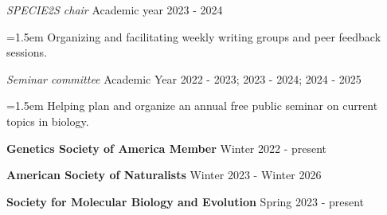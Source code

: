 \documentclass[11pt]{extarticle}
\begin{document}
\vspace{1mm}
\textit{SPECIE2S chair} \hfill Academic year 2023 - 2024 \par
{\narrower \hangindent=1.5em {Organizing and facilitating weekly writing groups and peer feedback sessions.} \normalsize \par }
\vspace{2.5mm}
\vspace{1mm}
\textit{Seminar committee} \hfill Academic Year 2022 - 2023; 2023 - 2024; 2024 - 2025 \par
{\narrower \hangindent=1.5em {Helping plan and organize an annual free public seminar on current topics in biology.} \normalsize \par }
\vspace{2.5mm}
\noindent \textbf{Genetics Society of America Member} \hfill Winter 2022 - present \par
\vspace{2.5mm}
\noindent \textbf{American Society of Naturalists} \hfill Winter 2023 - Winter 2026 \par
\vspace{2.5mm}
\noindent \textbf{Society for Molecular Biology and Evolution} \hfill Spring 2023 - present \par
\end{document}
